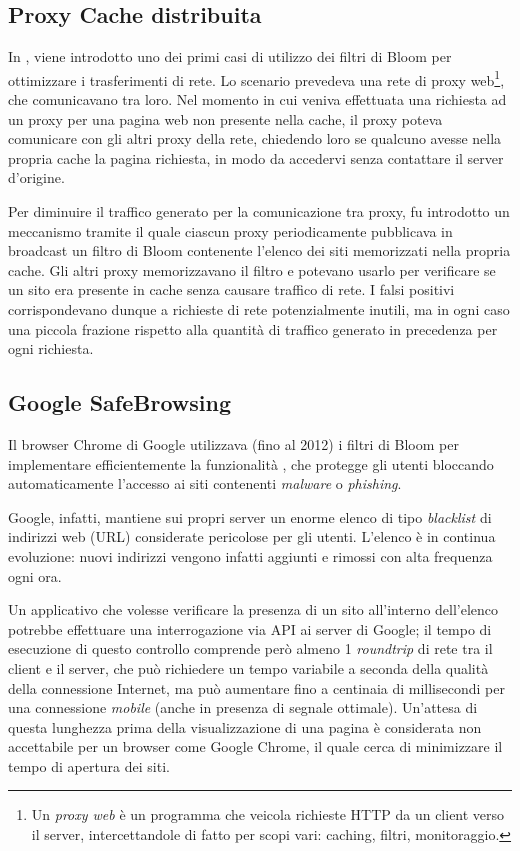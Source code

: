 \subsection{Proxy Cache distribuita}

In \cite{bloom-proxy}, viene introdotto uno dei primi casi di utilizzo dei filtri di Bloom per
ottimizzare i trasferimenti di rete. Lo scenario prevedeva una rete di proxy web\footnote{Un
\emph{proxy web} è un programma che veicola richieste HTTP da un client verso il server,
intercettandole di fatto per scopi vari: caching, filtri, monitoraggio.}, che comunicavano tra loro.
Nel momento in cui veniva effettuata una richiesta ad un proxy per una pagina web non presente nella
cache, il proxy poteva comunicare con gli altri proxy della rete, chiedendo loro se qualcuno avesse
nella propria cache la pagina richiesta, in modo da accedervi senza contattare il server d'origine.

Per diminuire il traffico generato per la comunicazione tra proxy, fu introdotto un meccanismo
tramite il quale ciascun proxy periodicamente pubblicava in broadcast un filtro di Bloom contenente
l'elenco dei siti memorizzati nella propria cache. Gli altri proxy memorizzavano il filtro e
potevano usarlo per verificare se un sito era presente in cache senza causare traffico di rete. I
falsi positivi corrispondevano dunque a richieste di rete potenzialmente inutili, ma in ogni caso
una piccola frazione rispetto alla quantità di traffico generato in precedenza per ogni richiesta.


\subsection{Google SafeBrowsing}

Il browser Chrome di Google utilizzava (fino al 2012) i filtri di Bloom per implementare
efficientemente la funzionalità , che
protegge gli utenti bloccando automaticamente l'accesso ai siti contenenti \emph{malware} o
\emph{phishing}.

Google, infatti, mantiene sui propri server un enorme elenco di tipo \emph{blacklist} di indirizzi
web (URL) considerate pericolose per gli utenti. L'elenco è in continua evoluzione: nuovi indirizzi
vengono infatti aggiunti e rimossi con alta frequenza ogni ora.

Un applicativo che volesse verificare la presenza di un sito all'interno dell'elenco potrebbe
effettuare una interrogazione via API ai server di Google; il tempo di esecuzione di questo
controllo comprende però almeno 1 \emph{roundtrip} di rete tra il client e il server, che può
richiedere un tempo variabile a seconda della qualità della connessione Internet, ma può aumentare
fino a centinaia di millisecondi per una connessione \emph{mobile} (anche in presenza di segnale
ottimale). Un'attesa di questa lunghezza prima della visualizzazione di una pagina è considerata non
accettabile per un browser come Google Chrome, il quale cerca di minimizzare il tempo di apertura
dei siti.

